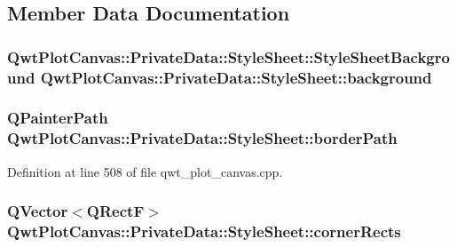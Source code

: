 \subsection{Member Data Documentation}
\hypertarget{struct_qwt_plot_canvas_1_1_private_data_1_1_style_sheet_a9f312698dc61e2243eaea5197e7d53d6}{
\subsubsection[{background}]{ {\bf Qwt\-Plot\-Canvas\-::\-Private\-Data\-::\-Style\-Sheet\-::\-Style\-Sheet\-Background}  Qwt\-Plot\-Canvas\-::\-Private\-Data\-::\-Style\-Sheet\-::background}}\label{struct_qwt_plot_canvas_1_1_private_data_1_1_style_sheet_a9f312698dc61e2243eaea5197e7d53d6}
\hypertarget{struct_qwt_plot_canvas_1_1_private_data_1_1_style_sheet_a2f6b6f49f6bf25960225a40512bb4206}{
\subsubsection[{border\-Path}]{\setlength{\rightskip}{0pt plus 5cm}Q\-Painter\-Path Qwt\-Plot\-Canvas\-::\-Private\-Data\-::\-Style\-Sheet\-::border\-Path}}\label{struct_qwt_plot_canvas_1_1_private_data_1_1_style_sheet_a2f6b6f49f6bf25960225a40512bb4206}


Definition at line 508 of file qwt\-\_\-plot\-\_\-canvas.\-cpp.

\hypertarget{struct_qwt_plot_canvas_1_1_private_data_1_1_style_sheet_ab47219e8d22ef67c230985f8e9f9664d}{
\subsubsection[{corner\-Rects}]{\setlength{\rightskip}{0pt plus 5cm}Q\-Vector$<$Q\-Rect\-F$>$ Qwt\-Plot\-Canvas\-::\-Private\-Data\-::\-Style\-Sheet\-::corner\-Rects}}\label{struct_qwt_plot_canvas_1_1_private_data_1_1_style_sheet_ab47219e8d22ef67c230985f8e9f9664d}


